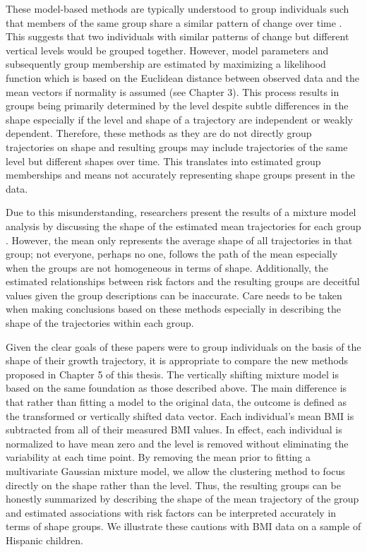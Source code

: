These model-based methods are typically understood to group individuals such that members of the same group share a similar pattern of change over time \cite{garden2012}. This suggests that two individuals with similar patterns of change but different vertical levels would be grouped together. However, model parameters and subsequently group membership are estimated by maximizing a likelihood function which is based on the Euclidean distance between observed data and the mean vectors if normality is assumed (see Chapter 3). This process results in groups being primarily determined by the level despite subtle differences in the shape especially if the level and shape of a trajectory are independent or weakly dependent. Therefore, these methods as they are do not directly group trajectories on shape and resulting groups may include trajectories of the same level but different shapes over time. This translates into estimated group memberships and means not accurately representing shape groups present in the data.

Due to this misunderstanding, researchers present the results of a mixture model analysis by discussing the shape of the estimated mean trajectories for each group \cite{pryor2011,carter2012}. However, the mean only represents the average shape of all trajectories in that group; not everyone, perhaps no one, follows the path of the mean especially when the groups are not homogeneous in terms of shape. Additionally, the estimated relationships between risk factors and the resulting groups are deceitful values given the group descriptions can be inaccurate. Care needs to be taken when making conclusions based on these methods especially in describing the shape of the trajectories within each group.  

Given the clear goals of these papers were to group individuals on the basis of the shape of their growth trajectory, it is appropriate to compare the new methods proposed in Chapter 5 of this thesis. The vertically shifting mixture model is based on the same foundation as those described above. The main difference is that rather than fitting a model to the original data, the outcome is defined as the transformed or vertically shifted data vector. Each individual's mean BMI is subtracted from all of their measured BMI values. In effect, each individual is normalized to have mean zero and the level is removed without eliminating the variability at each time point. By removing the mean prior to fitting a multivariate Gaussian mixture model, we allow the clustering method to focus directly on the shape rather than the level. Thus, the resulting groups can be honestly summarized by describing the shape of the mean trajectory of the group and estimated associations with risk factors can be interpreted accurately in terms of shape groups. We illustrate these cautions with BMI data on a sample of Hispanic children.


